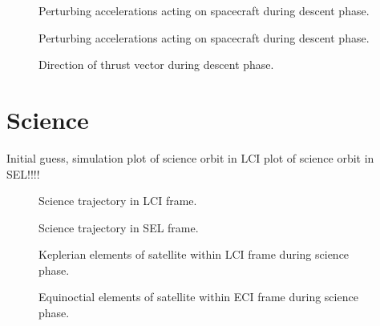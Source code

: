 \begin{figure}
\centering
\def\svgwidth{\figurewidth}

\caption{Perturbing accelerations acting on spacecraft during descent phase.}
\label{fig:Descent-pert}
\end{figure}

\begin{figure}
\centering
\def\svgwidth{\figurewidth}

\caption{Perturbing accelerations acting on spacecraft during descent phase.}
\label{fig:Descent-pert2}
\end{figure}

\begin{figure}
\centering
\def\svgwidth{\figurewidth}

\caption{Direction of thrust vector during descent phase.}
\label{fig:Descent-thrust}
\end{figure}


\clearpage

\section{Science}
Initial guess, simulation
plot of science orbit in LCI
plot of science orbit in SEL!!!! 

\begin{figure}
\centering
\def\svgwidth{\figurewidth}

\caption{Science trajectory in LCI frame.}
\label{fig:Science-3D-lci}
\end{figure}

\begin{figure}
\centering
\def\svgwidth{\figurewidth}

\caption{Science trajectory in SEL frame.}
\label{fig:Science-3D-sel}
\end{figure}

\begin{figure}
\centering
\def\svgwidth{\figurewidth}

\caption{Keplerian elements of satellite within LCI frame during science phase.}
\label{fig:Science-kep-lci}
\end{figure}

\begin{figure}
\centering
\def\svgwidth{\figurewidth}

\caption{Equinoctial elements of satellite within ECI frame during science phase.}
\label{fig:Science-mee}
\end{figure}

